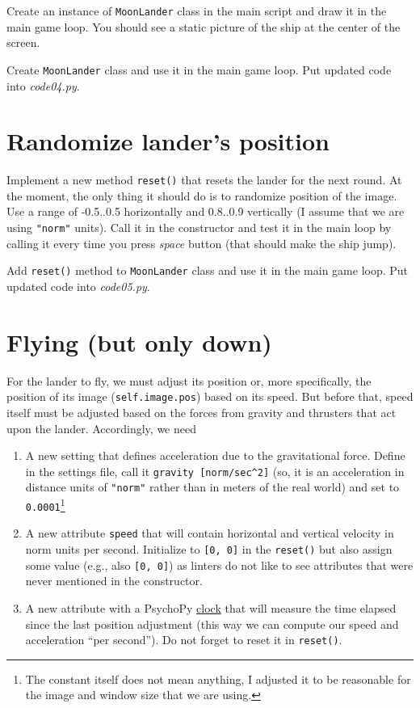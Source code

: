 \documentclass[
]{book}
\providecommand{\tightlist}{%
  \setlength{\itemsep}{0pt}\setlength{\parskip}{0pt}}
\begin{document}
Create an instance of \texttt{MoonLander} class in the main script and draw it in the main game loop. You should see a static picture of the ship at the center of the screen.

Create \texttt{MoonLander} class and use it in the main game loop.
Put updated code into \emph{code04.py}.

\hypertarget{randomize-landers-position}{%
\section{Randomize lander's position}\label{randomize-landers-position}}

Implement a new method \texttt{reset()} that resets the lander for the next round. At the moment, the only thing it should do is to randomize position of the image. Use a range of -0.5..0.5 horizontally and 0.8..0.9 vertically (I assume that we are using \texttt{"norm"} units). Call it in the constructor and test it in the main loop by calling it every time you press \emph{space} button (that should make the ship jump).

Add \texttt{reset()} method to \texttt{MoonLander} class and use it in the main game loop.
Put updated code into \emph{code05.py}.

\hypertarget{flying-but-only-down}{%
\section{Flying (but only down)}\label{flying-but-only-down}}

For the lander to fly, we must adjust its position or, more specifically, the position of its image (\texttt{self.image.pos}) based on its speed. But before that, speed itself must be adjusted based on the forces from gravity and thrusters that act upon the lander. Accordingly, we need

\begin{enumerate}
\def\labelenumi{\arabic{enumi}.}
\tightlist
\item
  A new setting that defines acceleration due to the gravitational force. Define in the settings file, call it \texttt{gravity\ {[}norm/sec\^{}2{]}} (so, it is an acceleration in distance units of \texttt{"norm"} rather than in meters of the real world) and set to \texttt{0.0001}\footnote{The constant itself does not mean anything, I adjusted it to be reasonable for the image and window size that we are using.}
\item
  A new attribute \texttt{speed} that will contain horizontal and vertical velocity in norm units per second. Initialize to \texttt{{[}0,\ 0{]}} in the \texttt{reset()} but also assign some value (e.g., also \texttt{{[}0,\ 0{]}}) as linters do not like to see attributes that were never mentioned in the constructor.
\item
  A new attribute with a PsychoPy \href{https://psychopy.org/api/clock.html\#psychopy.clock.Clock}{clock} that will measure the time elapsed since the last position adjustment (this way we can compute our speed and acceleration ``per second''). Do not forget to reset it in \texttt{reset()}.
\end{enumerate}
\end{document}
